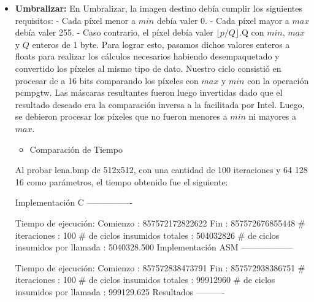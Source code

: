 \documentclass[10pt, a4paper]{article}
\begin{document}
\begin{itemize}
\item {\textbf{Umbralizar:}}
En Umbralizar, la imagen destino debía cumplir los siguientes requisitos:
- Cada píxel menor a $min$ debía valer 0.\newline
- Cada píxel mayor a $max$ debía valer 255.\newline
- Caso contrario, el píxel debía valer $\lfloor p/Q \rfloor$.Q\newline
con $min$, $max$ y $Q$ enteros de 1 byte.\newline
Para lograr esto, pasamos dichos valores enteros a floats para realizar los cálculos necesarios habiendo desempaquetado y convertido los píxeles al mismo tipo de dato.\newline
Nuestro ciclo consistió en procesar de a 16 bits comparando los píxeles con $max$ y $min$ con la operación pcmpgtw. Las máscaras resultantes fueron luego invertidas dado que el resultado deseado era la comparación inversa a la facilitada por Intel. Luego, se debieron procesar los píxeles que no fueron menores a $min$ ni mayores a $max$.  
\begin{itemize}
\item{Comparación de Tiempo}
\end{itemize}
Al probar lena.bmp de 512x512, con una cantidad de 100 iteraciones y 64 128 16 como parámetros, el tiempo obtenido fue el siguiente: \newline

Implementación C\newline
----------------\newline

Tiempo de ejecución:\newline
  Comienzo                          : 857572172822622\newline
  Fin                               : 857572676855448\newline
  \# iteraciones                     : 100\newline
  \# de ciclos insumidos totales     : 504032826\newline
  \# de ciclos insumidos por llamada : 5040328.500\newline
\newline
Implementación ASM\newline
------------------\newline

Tiempo de ejecución:\newline
  Comienzo                          : 857572838473791\newline
  Fin                               : 857572938386751\newline
  \# iteraciones                     : 100\newline
  \# de ciclos insumidos totales     : 99912960\newline
  \# de ciclos insumidos por llamada : 999129.625\newline
\newline
Resultados\newline
----------\newline


\end{itemize}
\end{document}
